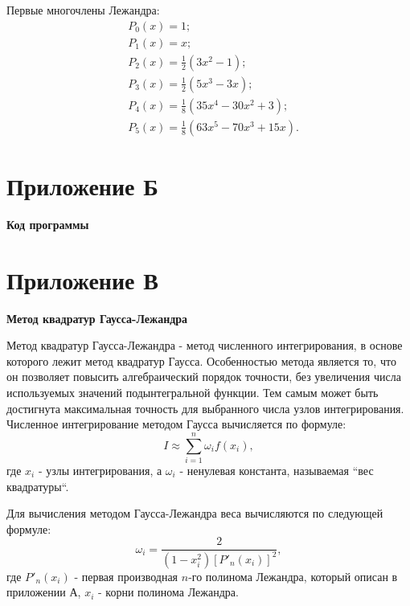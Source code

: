 {{    Первые многочлены Лежандра:
    \begin{align*}
     &P_0(x) = 1; \\
     &P_1(x) = x; \\
     &P_2(x)=\frac{1}{2}(3x^2-1); \\
     &P_3(x)=\frac{1}{2}(5x^3-3x); \\
     &P_4(x)=\frac{1}{8}(35x^4-30x^2+3); \\
     &P_5(x)=\frac{1}{8}(63x^5-70x^3+15x).
    \end{align*}
}

\newpage
{}
{}
\section*{Приложение Б}
{
	\begin{center}
	\textbf{Код программы}
	\end{center}
	
}

\newpage
{}
{}
\section*{Приложение В}
{
\begin{center}
	\textbf{Метод квадратур Гаусса-Лежандра}
	\end{center}
	
	Метод квадратур Гаусса-Лежандра - метод численного интегрирования, в основе которого лежит метод квадратур Гаусса.
	Особенностью метода является то, что он позволяет повысить алгебраический порядок точности, без увеличения числа 
	используемых значений подынтегральной функции. 
	Тем самым может быть достигнута максимальная точность для выбранного числа узлов интегрирования.
	Численное интегрирование методом Гаусса вычисляется по формуле:
	\begin{equation}
	    I \approx \sum_{i=1}^{n}{\omega_i f(x_i)},
	\end{equation}
	где $x_i$ - узлы интегрирования, а $\omega_i$ - ненулевая константа, называемая ``вес квадратуры``.
	
	Для вычисления методом Гаусса-Лежандра веса вычисляются по следующей формуле:
	\begin{equation}
	    \omega_i = \dfrac{2}{(1-x^{2}_{i})\left[ P'_n(x_i) \right]^2},
	\end{equation}
	где $P'_n(x_i)$ - первая производная $n$-го полинома Лежандра, который описан в приложении А, 
	$x_i$ - корни полинома Лежандра.
	
}}
